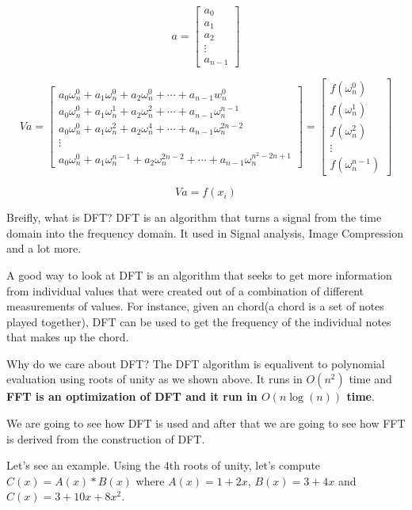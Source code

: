 \documentclass[11pt]{article}
\begin{document}
\[a = \begin{bmatrix}a_0 \\ a_1 \\ a_2 \\ \vdots \\ a_{n - 1}\end{bmatrix}\]

\[Va = \begin{bmatrix}a_0\omega_n^0 + a_1\omega_n^0 + a_2\omega_n^0 + \cdots + a_{n - 1}w_n^0 \\ a_0\omega_n^0 + a_1\omega_n^1 + a_2\omega_n^2 + \cdots + a_{n - 1}\omega_n^{n - 1} \\ a_0\omega_n^0 + a_1\omega_n^2 + a_2\omega_n^4 + \cdots + a_{n - 1}\omega_n^{2n - 2} \\ \vdots \\ a_0\omega_n^0 + a_1\omega_n^{n - 1} + a_2\omega_n^{2n - 2} + \cdots + a_{n - 1}\omega_n^{n^2 - 2n + 1} \end{bmatrix} = \begin{bmatrix} f(\omega_n^0) \\ f(\omega_n^1) \\ f(\omega_n^2) \\ \vdots \\ f(\omega_n^{n - 1}) \end{bmatrix}\]

\[ Va = f(x_i)\]

    Breifly, what is DFT? DFT is an algorithm that turns a signal from the
time domain into the frequency domain. It used in Signal analysis, Image
Compression and a lot more.

A good way to look at DFT is an algorithm that seeks to get more
information from individual values that were created out of a
combination of different measurements of values. For instance, given an
chord(a chord is a set of notes played together), DFT can be used to get
the frequency of the individual notes that makes up the chord.

Why do we care about DFT? The DFT algorithm is equalivent to polynomial
evaluation using roots of unity as we shown above. It runs in \(O(n^2)\)
time and \textbf{FFT is an optimization of DFT and it run in
\(O(n\log(n))\) time}.

We are going to see how DFT is used and after that we are going to see
how FFT is derived from the construction of DFT.

Let's see an example. Using the \(4\)th roots of unity, let's compute
\(C(x) = A(x) * B(x)\) where \(A(x) = 1 + 2x\), \(B(x) = 3 + 4x\) and
\(C(x) = 3 + 10x + 8x^2\).
\end{document}
